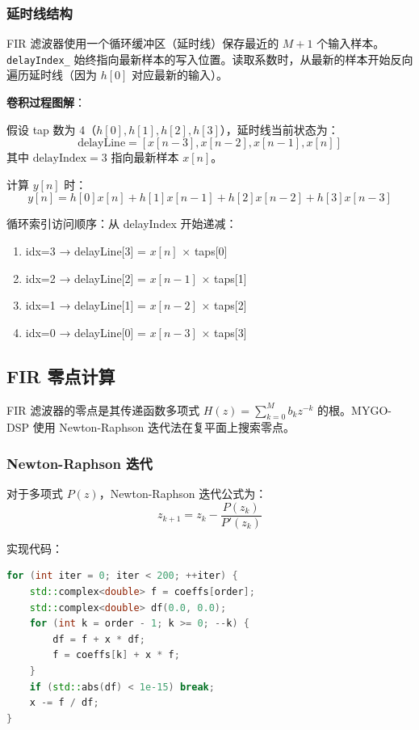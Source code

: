 ﻿\documentclass[12pt,a4paper,oneside]{ctexbook}
\begin{document}
\subsubsection{延时线结构}

FIR 滤波器使用一个循环缓冲区（延时线）保存最近的 \(M+1\) 个输入样本。\texttt{delayIndex\_} 始终指向最新样本的写入位置。读取系数时，从最新的样本开始反向遍历延时线（因为 \(h[0]\) 对应最新的输入）。

\textbf{卷积过程图解}：

假设 tap 数为 4（\(h[0], h[1], h[2], h[3]\)），延时线当前状态为：
\[
\text{delayLine} = [x[n-3], x[n-2], x[n-1], x[n]]
\]
其中 \(\text{delayIndex} = 3\) 指向最新样本 \(x[n]\)。

计算 \(y[n]\) 时：
\[
y[n] = h[0]x[n] + h[1]x[n-1] + h[2]x[n-2] + h[3]x[n-3]
\]

循环索引访问顺序：从 delayIndex 开始递减：
\begin{enumerate}
    \item idx=3 → delayLine[3] = \(x[n]\) × taps[0]
    \item idx=2 → delayLine[2] = \(x[n-1]\) × taps[1]
    \item idx=1 → delayLine[1] = \(x[n-2]\) × taps[2]
    \item idx=0 → delayLine[0] = \(x[n-3]\) × taps[3]
\end{enumerate}

\subsection{FIR 零点计算}

FIR 滤波器的零点是其传递函数多项式 \(H(z) = \sum_{k=0}^{M} b_k z^{-k}\) 的根。MYGO-DSP 使用 Newton-Raphson 迭代法在复平面上搜索零点。

\subsubsection{Newton-Raphson 迭代}

对于多项式 \(P(z)\)，Newton-Raphson 迭代公式为：
\[
z_{k+1} = z_k - \frac{P(z_k)}{P'(z_k)}
\]

实现代码：
\begin{lstlisting}[language=C++, caption={Newton-Raphson 求根}]
for (int iter = 0; iter < 200; ++iter) {
    std::complex<double> f = coeffs[order];
    std::complex<double> df(0.0, 0.0);
    for (int k = order - 1; k >= 0; --k) {
        df = f + x * df;
        f = coeffs[k] + x * f;
    }
    if (std::abs(df) < 1e-15) break;
    x -= f / df;
}
\end{lstlisting}
\end{document}
